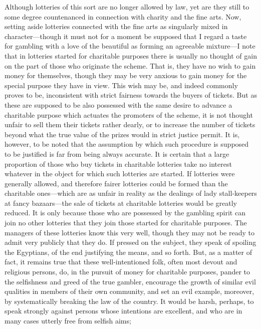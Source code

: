 \documentclass[letterpaper,12pt,oneside,openany]{memoir}
\begin{document}
Although lotteries of this sort are no longer allowed
by law, yet are they still to some degree countenanced in
connection with charity and the fine arts. Now, setting
aside lotteries connected with the fine arts as singularly
mixed in character---though it must not for a
moment be supposed that I regard a taste for gambling
with a love of the beautiful as forming an agreeable
mixture---I note that in lotteries started for
charitable purposes there is usually no thought of gain
on the part of those who originate the scheme. That
is, they have no wish to gain money for themselves,
though they may be very anxious to gain money for the
special purpose they have in view. This wish may be,
and indeed commonly proves to be, inconsistent with
strict fairness towards the buyers of tickets. But as
these are supposed to be also possessed with the same
desire to advance a charitable purpose which actuates the
promoters of the scheme, it is not thought unfair to sell
them their tickets rather dearly, or to increase the
number of tickets beyond what the true value of the
prizes would in strict justice permit. It is, however, to
be noted that the assumption by which such procedure
is supposed to be justified is far from being always accurate.
It is certain that a large proportion of those who
buy tickets in charitable lotteries take no interest whatever
in the object for which such lotteries are started.
If lotteries were generally allowed, and therefore fairer
lotteries could be formed than the charitable ones---which
are as unfair in reality as the dealings of lady
stall-keepers at fancy bazaars---the sale of tickets at
charitable lotteries would be greatly reduced. It is only
because those who are possessed by the gambling spirit
can join no other lotteries that they join those started
for charitable purposes. The managers of these lotteries
know this very well, though they may not be ready to
admit very publicly that they do. If pressed on the
subject, they speak of spoiling the Egyptians, of the
end justifying the means, and so forth. But, as a
matter of fact, it remains true that these well-intentioned
folk, often most devout and religious persons, do,
in the pursuit of money for charitable purposes, pander
to the selfishness and greed of the true gambler,
encourage the growth of similar evil qualities in
members of their own community, and set an evil
example, moreover, by systematically breaking the law
of the country. It would be harsh, perhaps, to speak
strongly against persons whose intentions are excellent,
and who are in many cases utterly free from selfish aims;
\end{document}
